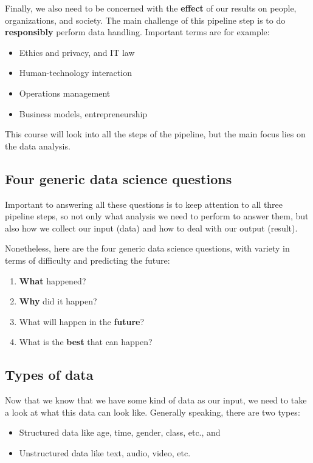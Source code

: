 Finally, we also need to be concerned with the \textbf{effect} of our results on people, organizations, and society. The main challenge of this pipeline step is to do \textbf{responsibly} perform data handling. Important terms are for example:
\begin{itemize}
  \item Ethics and privacy, and IT law
  \item Human-technology interaction
  \item Operations management
  \item Business models, entrepreneurship
\end{itemize}

This course will look into all the steps of the pipeline, but the main focus lies on the data analysis.


\subsection{Four generic data science questions}
Important to answering all these questions is to keep attention to all three pipeline steps, so not only what analysis we need to perform to answer them, but also how we collect our input (data) and how to deal with our output (result).

Nonetheless, here are the four generic data science questions, with variety in terms of difficulty and predicting the future:
\begin{enumerate}
  \item \textbf{What} happened?
  \item \textbf{Why} did it happen?
  \item What will happen in the \textbf{future}?
  \item What is the \textbf{best} that can happen?
\end{enumerate}


\subsection{Types of data}
Now that we know that we have some kind of data as our input, we need to take a look at what this data can look like. Generally speaking, there are two types:
\begin{itemize}
  \item {}Structured data like age, time, gender, class, etc., and
  \item {}Unstructured data like text, audio, video, etc.
\end{itemize}

